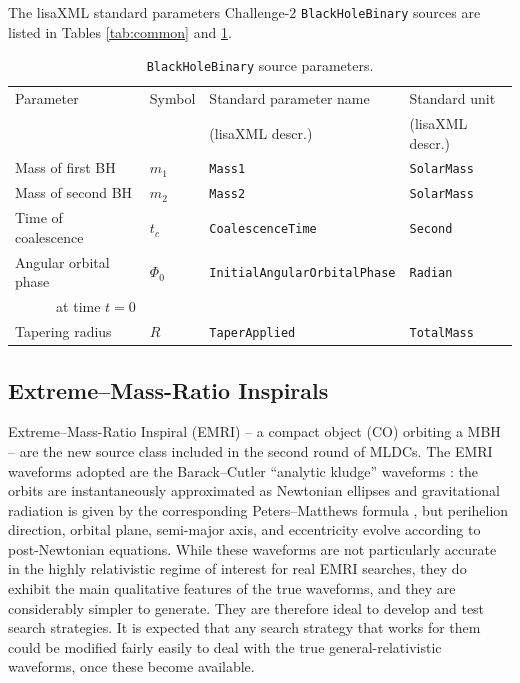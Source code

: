 \documentclass[12pt]{iopart}
\begin{document}
The lisaXML standard parameters Challenge-2 \texttt{BlackHoleBinary} sources are listed in Tables \ref{tab:common} and \ref{tab:bbh}.
%
\begin{table}
\begin{tabular}{llll}
\hline
{Parameter} &
{Symbol} &
{Standard parameter name} &
{Standard unit} \\
& & (lisaXML descr.) & (lisaXML descr.) \\
\hline
Mass of first BH    & $m_1$  & \texttt{Mass1}           & \texttt{SolarMass} \\
Mass of second BH   & $m_2$  & \texttt{Mass2}           & \texttt{SolarMass} \\
Time of coalescence & $t_c$  & \texttt{CoalescenceTime} & \texttt{Second} \\
Angular orbital phase & $\Phi_0$ & \texttt{InitialAngularOrbitalPhase} & \texttt{Radian} \\
\multicolumn{1}{r}{at time $t = 0$} & & & \\
Tapering radius & $R$    & \texttt{TaperApplied}    & \texttt{TotalMass} \\ 
\hline
\end{tabular}
\caption{\texttt{BlackHoleBinary} source parameters.\label{tab:bbh}}
\end{table}

\subsection{Extreme--Mass-Ratio Inspirals}

Extreme--Mass-Ratio Inspiral (EMRI) -- a compact object (CO) orbiting a MBH -- are the new source class included in the second round of MLDCs. The EMRI waveforms adopted are the Barack--Cutler ``analytic kludge'' waveforms \cite{BC}: the orbits are instantaneously approximated as Newtonian ellipses and gravitational radiation is given by the corresponding Peters--Matthews formula \cite{pm}, but perihelion direction, orbital plane, semi-major axis, and eccentricity evolve according to post-Newtonian equations. While these waveforms are not particularly accurate in the highly relativistic regime of interest for real EMRI searches, they do exhibit the main qualitative features of the true waveforms, and they are considerably simpler to generate.  They are therefore ideal to develop and test search strategies. It is expected that any search strategy that works for them could be modified fairly easily to deal with the true general-relativistic waveforms, once these become available.
\end{document}
